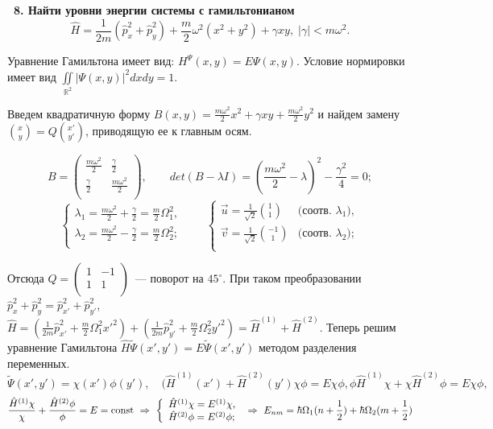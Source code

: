 \documentclass[a4paper,12pt]{article}
\begin{document}
\noindent\textbf{~8. Найти уровни энергии системы с гамильтонианом $$\hat
{H} = \frac{1}{2m}\left( {\hat {p}_x^2 + \hat {p}_y^2 } \right) +
\frac{m}{2}\omega ^2\left( {x^2 + y^2} \right) + \gamma
xy,\;\left| \gamma \right| < m\omega ^2.$$}

Уравнение Гамильтона имеет вид: $H^\Psi(x,y)=E\Psi(x,y)$. Условие
нормировки имеет вид $\iint\limits_{\mathbb{R}^2}|\Psi(x,y)|^2dxdy=1$.

Введем квадратичную форму
$\displaystyle B(x,y)=\frac{m\omega^2}2x^2+\gamma xy+\frac{m\omega^2}2y^2$
и найдем замену ${x\choose y}=Q{x'\choose y'}$, приводящую ее к главным осям.

$$B=\left(\begin{array}{cc}
   \frac{m\omega^2}2 & \frac\gamma2\\
   \frac\gamma2 & \frac{m\omega^2}2\\
 \end{array}\right), \qquad
  det(B-\lambda I)=
 \left(\frac{m\omega^2}2-\lambda\right)^2-\frac{\gamma^2}4=0;$$
%
$$\left\{\begin{array}{l}
  \lambda_1=\frac{m\omega^2}2+\frac\gamma2=\frac m2\Omega_1^2,\\
  \lambda_2=\frac{m\omega^2}2-\frac\gamma2=\frac m2\Omega_2^2;\\
\end{array}\right.\qquad
\left\{\begin{array}{ll}
  \vec u=\frac1{\sqrt2}{1\choose1} & \mbox{(соотв. $\lambda_1$)},\\
  \vec v=\frac1{\sqrt2}{-1\choose1}& \mbox{(соотв. $\lambda_2$)};\\
\end{array}\right.$$

Отсюда $Q=\left(\begin{array}{cc}1&-1\\1&1\\\end{array}\right)$~---
поворот на $45^\circ$. При таком преобразовании
$\hat p_x^2+\hat p_y^2=\hat p_{x'}^2+\hat p_{y'}^2$,
$\hat H=\left(\frac1{2m}\hat p_{x'}^2+\frac m2\Omega_1^2x'^2\right)+
        \left(\frac1{2m}\hat p_{y'}^2+\frac m2\Omega_2^2y'^2\right)=
 \hat H^{(1)}+\hat H^{(2)}$.
Теперь решим уравнение Гамильтона $\hat H\tilde\Psi(x',y')=E\tilde\Psi(x',y')$
методом разделения переменных.
%
$$\tilde\Psi(x',y')=\chi(x')\phi(y'),\quad
(\hat H^{(1)}(x')+\hat H^{(2)}(y')\chi\phi=E\chi\phi,
\phi\hat H^{(1)}\chi+\chi\hat H^{(2)}\phi=E\chi\phi,$$
%
$$\frac{\hat H^{(1)}\chi}\chi+\frac{\hat H^{(2)}\phi}\phi=
   E=\mathord{\rm const}\ \Rightarrow\ \left\{\begin{array}{l}
     \hat H^{(1)}\chi=E^{(1)}\chi,\\
     \hat H^{(2)}\phi=E^{(2)}\phi;\\
   \end{array}\right.\ \Rightarrow\ E_{nm}=\hbar\Omega_1(n+\frac12)+
     \hbar\Omega_2(m+\frac12)$$
\end{document}
